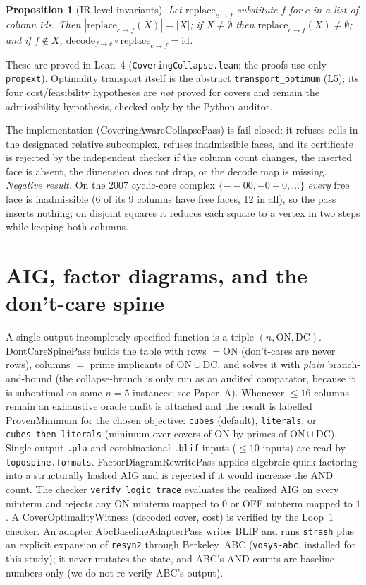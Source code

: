 \documentclass[11pt]{article}
\newtheorem{proposition}[theorem]{Proposition}
\begin{document}
\begin{proposition}[IR-level invariants]\label{prop:ir}
Let $\mathrm{replace}_{c\to f}$ substitute $f$ for $c$ in a list of column ids.
Then $|\mathrm{replace}_{c\to f}(X)|=|X|$; if $X\neq\emptyset$ then
$\mathrm{replace}_{c\to f}(X)\neq\emptyset$; and if $f\notin X$,
$\mathrm{decode}_{f\to c}\circ \mathrm{replace}_{c\to f}=\mathrm{id}$.
\end{proposition}
These are proved in Lean~4 (\texttt{CoveringCollapse.lean}; the proofs use only
\texttt{propext}).  Optimality transport itself is the abstract
\texttt{transport\_optimum} (L5); its four cost/feasibility hypotheses are
\emph{not} proved for covers and remain the admissibility hypothesis, checked
only by the Python auditor.

The implementation (\textsf{CoveringAwareCollapsePass}) is fail-closed: it
refuses cells in the designated relative subcomplex, refuses inadmissible
faces, and its certificate is rejected by the independent checker if the column
count changes, the inserted face is absent, the dimension does not drop, or the
decode map is missing.  \emph{Negative result.}  On the 2007 cyclic-core complex
$\{{--00},{-0-0},\dots\}$ \emph{every} free face is inadmissible
(6 of its 9 columns have free faces, 12 in all), so the pass inserts nothing; on disjoint squares it
reduces each square to a vertex in two steps while keeping both columns.

\section{AIG, factor diagrams, and the don't-care spine}
A single-output incompletely specified function is a triple
$(n,\mathrm{ON},\mathrm{DC})$.  \textsf{DontCareSpinePass} builds the table with
rows $=\mathrm{ON}$ (don't-cares are never rows), columns $=$ prime implicants of
$\mathrm{ON}\cup\mathrm{DC}$, and solves it with \emph{plain} branch-and-bound (the
collapse-branch is only run as an audited comparator, because it is suboptimal on some
$n=5$ instances; see Paper~A).  Whenever $\le 16$ columns remain an exhaustive oracle
audit is attached and the result is labelled \textsf{ProvenMinimum} for the chosen
objective: \texttt{cubes} (default), \texttt{literals}, or \texttt{cubes\_then\_literals}
(minimum over covers of ON by primes of $\mathrm{ON}\cup\mathrm{DC}$).  Single-output
\texttt{.pla} and combinational \texttt{.blif} inputs ($\le 10$ inputs) are read by
\texttt{topospine.formats}.  \textsf{FactorDiagramRewritePass} applies algebraic quick-factoring
into a structurally hashed AIG and is rejected if it would increase the AND
count.  The checker \texttt{verify\_logic\_trace} evaluates the realized AIG on
every minterm and rejects any ON minterm mapped to $0$ or OFF minterm mapped to
$1$.  A \textsf{CoverOptimalityWitness} (decoded cover, cost) is verified by the
Loop~1 checker.  An adapter \textsf{AbcBaselineAdapterPass} writes BLIF and runs
\texttt{strash} plus an explicit expansion of \texttt{resyn2} through Berkeley~ABC
(\texttt{yosys-abc}, installed for this study); it never mutates the state, and
ABC's AND counts are baseline numbers only (we do not re-verify ABC's output).
\end{document}
